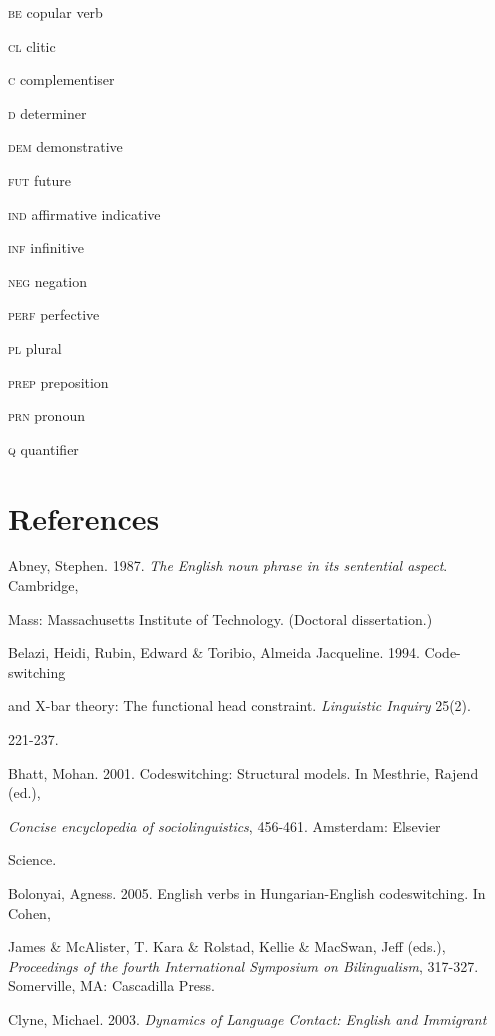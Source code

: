 \documentclass[output=paper]{langsci/langscibook}
\begin{document}
\textsc{be}  copular verb

\textsc{cl}  clitic

\textsc{c}  complementiser

\textsc{d}  determiner

\textsc{dem}  demonstrative

\textsc{fut}  future

\begin{styleListBullet}
\textsc{ind}    affirmative indicative
\end{styleListBullet}

\textsc{inf}  infinitive

\textsc{neg}  negation

\textsc{perf}  perfective

\textsc{pl}  plural

\textsc{prep}  preposition

\textsc{prn}  pronoun

\textsc{q}  quantifier

\section{ References}

Abney, Stephen. 1987. \textit{The English noun phrase in its sentential aspect}. Cambridge, 

  Mass: Massachusetts Institute of Technology. (Doctoral dissertation.)

Belazi, Heidi, Rubin, Edward \& Toribio, Almeida Jacqueline. 1994. Code-switching 

and X-bar theory: The functional head constraint. \textit{Linguistic Inquiry} 25(2). 

221-237.

Bhatt, Mohan. 2001. Codeswitching: Structural models. In Mesthrie, Rajend (ed.), 

  \textit{Concise encyclopedia of sociolinguistics}, 456-461. Amsterdam: Elsevier 

  Science. 


Bolonyai, Agness. 2005. English verbs in Hungarian-English codeswitching. In Cohen, 



James \& McAlister, T. Kara \& Rolstad, Kellie \& MacSwan, Jeff (eds.), \textit{Proceedings of the fourth International Symposium on Bilingualism}, 317-327. Somerville, MA: Cascadilla Press. 



Clyne, Michael. 2003. \textit{Dynamics of Language Contact: English and Immigrant }
\end{document}
